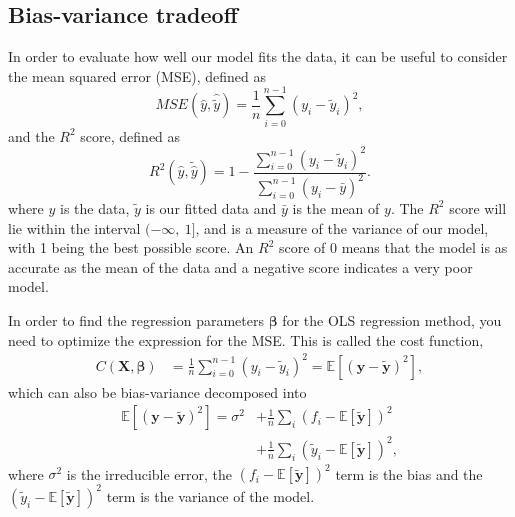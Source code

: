 \documentclass[a4paper, 10pt]{article}
\begin{document}
\begin{multicols}{2}
\subsection{Bias-variance tradeoff}
In order to evaluate how well our model fits the data, it can be useful to consider the mean squared error (MSE), defined as
\begin{equation}
    MSE(\hat{y},\hat{\tilde{y}}) = \frac{1}{n}
    \sum_{i=0}^{n-1}(y_i-\tilde{y}_i)^2,
    \label{eq:MSE}
\end{equation}
and the $R^2$ score, defined as
\begin{equation}
    R^2(\hat{y}, \tilde{\hat{y}}) = 1 - \frac{\sum_{i=0}^{n - 1} (y_i - \tilde{y}_i)^2}{\sum_{i=0}^{n - 1} (y_i - \bar{y})^2}.
    \label{eq:R2}
\end{equation}
where $y$ is the data, $\tilde{y}$ is our fitted data and $\bar{y}$ is the mean of $y$.  The $R^2$ score will lie within the interval $(-\infty,\ 1]$, and is a measure of the variance of our model, with 1 being the best possible score. An $R^2$ score of 0 means that the model is as accurate as the mean of the data and a negative score indicates a very poor model.

In order to find the regression parameters $\bm{\beta}$ for the OLS regression method, you need to  optimize the expression for the MSE. This is called the cost function,
\begin{align*}
C(\bm{X},\bm{\beta} ) &= \frac{1}{n}\sum_{i=0}^{n-1}(y_i-\tilde{y}_i)^2 = \mathbb{E}[	(\bm{y}-\bm{\tilde{y}})^2],
\end{align*}
which can also be bias-variance decomposed into
\begin{align}
 \mathbb{E}[	(\bm{y}-\bm{\tilde{y}})^2]  =\sigma^2 &+ \frac{1}{n}\sum_i(f_i-\mathbb{E}\left[\bm{\tilde{y}}\right])^2  \nonumber \\
 &+ \frac{1}{n}\sum_i(\tilde{y}_i-\mathbb{E}\left[\bm{\tilde{y}}\right])^2,
 \label{eq:biasvariance}
\end{align}
where $\sigma^2$ is the irreducible error,  the $(f_i-\mathbb{E}\left[\bm{\tilde{y}}\right])^2$ term is the bias and the $(\tilde{y}_i-\mathbb{E}\left[\bm{\tilde{y}}\right])^2$ term is the variance of the model.


\end{multicols}
\end{document}
